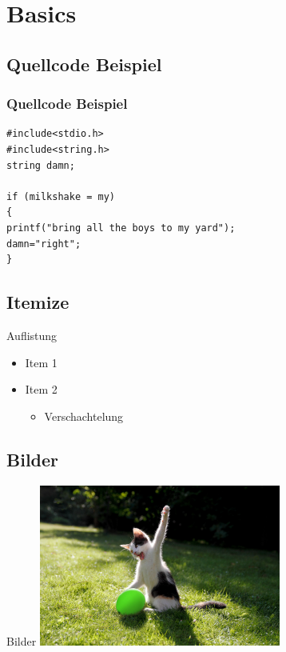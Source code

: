 \documentclass[xcolor=x11names,compress]{beamer} %
\renewcommand{\(}{\begin{columns}}
\renewcommand{\)}{\end{columns}}
\newcommand{\<}[1]{\begin{column}{#1}}
\renewcommand{\>}{\end{column}}
\begin{document}
\section{Basics}
	\subsection{Quellcode Beispiel}
	\begin{frame}[fragile]
	\frametitle{Quellcode Beispiel}
		\begin{lstlisting}
#include<stdio.h> 
#include<string.h>
string damn;

if (milkshake = my)
{
printf("bring all the boys to my yard");
damn="right";
}
		\end{lstlisting}
	\end{frame}	


	\subsection{Itemize}
		\begin{frame}{Auflistung}
			\begin{itemize}
				\item Item 1
				\pause
				\item Item 2
				\pause
					\begin{itemize}
						\item Verschachtelung
					\end{itemize}
			\end{itemize}
		\end{frame}

	\subsection{Bilder}
		\begin{frame}{Bilder}
			\includegraphics[width=300px]{images/IIctNxU.jpg}
		\end{frame}
\end{document}
